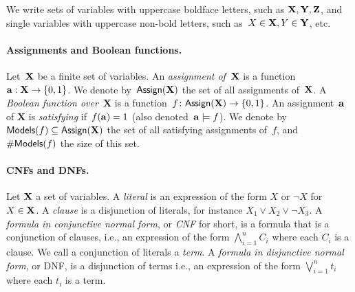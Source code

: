 We write sets of variables with uppercase boldface letters, such as $\mathbf{X},\mathbf{Y},\mathbf{Z}$, and single
variables with uppercase non-bold letters, such as~$X\in \mathbf{X}, Y\in \mathbf{Y}$, etc.

\paragraph*{Assignments and Boolean functions.}
Let~$\mathbf{X}$ be a finite set of variables.  An \emph{assignment of~$\mathbf{X}$} is a
function~$\mathbf{a}: \mathbf{X} \to \{0,1\}$. We denote by~$\mathsf{Assign}(\mathbf{X})$ the set of all assignments
of~$\mathbf{X}$.  A \emph{Boolean function over~$\mathbf{X}$}
is a function~$f\colon \mathsf{Assign}(\mathbf{X})\to \{0,1\}$.
An assignment~$\mathbf{a}$ of $\mathbf{X}$ is \emph{satisfying} if~$f(\mathbf{a}) =1$ (also
denoted~$\mathbf{a} \models f$).  We denote by~$\mathsf{Models}(f)\subseteq \mathsf{Assign}(\mathbf{X})$ the set of all
satisfying assignments of~$f$, and~$\#\mathsf{Models}(f)$ the size of this set. 



\paragraph*{CNFs and DNFs.}
Let $\mathbf{X}$ a set of variables. A \emph{literal} is an expression of the form $X$
or $\lnot X$ for $X\in \mathbf{X}$. A \emph{clause} is a disjunction of literals, for
instance $X_1 \lor X_2 \lor \lnot X_3$. A \emph{formula in conjunctive normal
form}, or \emph{CNF} for short, is a formula that is a conjunction of clauses,
i.e., an expression of the form $\bigwedge_{i=1}^n C_i$ where each $C_i$ is a
clause. We call a conjunction of literals a \emph{term}. A \emph{formula in
disjunctive normal form}, or DNF, is a disjunction of terms i.e., an expression
of the form $\bigvee_{i=1}^n t_i$ where each $t_i$ is a term.
